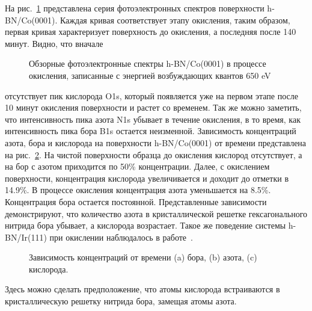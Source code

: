 На рис.~\ref{pic:Surveys} представлена серия фотоэлектронных спектров поверхности h-BN/Co(0001).
Каждая кривая соответствует этапу окисления, таким образом, первая кривая характеризует
поверхность до окисления, а последняя после 140 минут. Видно, что вначале
\begin{figure}[!ht]
\caption{Обзорные фотоэлектронные спектры h-BN/Co(0001) в процессе окисления, записанные с энергией
возбуждающих квантов 650 eV}
\label{pic:Surveys}
\end{figure}
отсутствует пик кислорода O1s, который появляется уже на первом этапе после 10 минут 
окисления поверхности и растет со временем. Так же можно заметить, что интенсивность
пика азота N1s убывает в течение окисления, в то время, как интенсивность пика бора
B1s остается неизменной. Зависимость концентраций азота, бора и кислорода на поверхности
h-BN/Co(0001) от времени представлена на рис.~\ref{pic:B_N_O_tot_percent}. 
На чистой поверхности образца до окисления кислород отсутствует, а на бор с азотом приходится
по 50\% концентрации. Далее, с окислением поверхности, концентрация кислорода увеличивается
и доходит до отметки в 14.9\%. В процессе окисления концентрация азота уменьшается на 8.5\%.
Концентрация бора остается постоянной. Представленные зависимости демонстрируют, что количество 
азота в кристаллической решетке гексагонального нитрида бора убывает, а кислорода возрастает.
Такое же поведение системы h-BN/Ir(111) при окислении наблюдалось в работе~\cite{Simonov2012_h-BN/Ir_Oxydation}. 
\begin{figure}[!ht]
\caption{Зависимость концентраций от времени (a) бора, (b) азота, (c) кислорода.}
\label{pic:B_N_O_tot_percent}
\end{figure}
Здесь можно сделать предположение, что атомы кислорода встраиваются в кристаллическую решетку
нитрида бора, замещая атомы азота.


